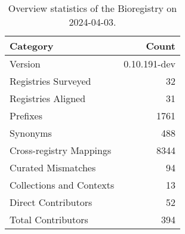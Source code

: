 \begin{table}
\caption{Overview statistics of the Bioregistry on 2024-04-03.}
\label{tab:bioregistry-summary}
\begin{tabular}{lr}
\toprule
Category & Count \\
\midrule
Version & 0.10.191-dev \\
Registries Surveyed & 32 \\
Registries Aligned & 31 \\
Prefixes & 1761 \\
Synonyms & 488 \\
Cross-registry Mappings & 8344 \\
Curated Mismatches & 94 \\
Collections and Contexts & 13 \\
Direct Contributors & 52 \\
Total Contributors & 394 \\
\bottomrule
\end{tabular}
\end{table}
